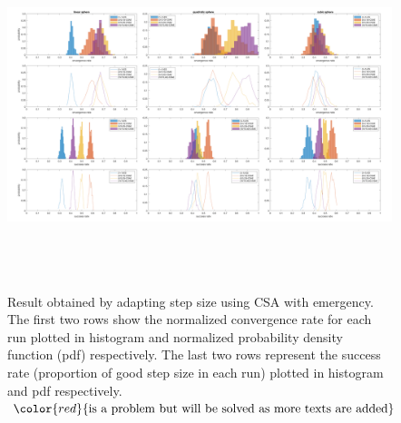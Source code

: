 \begin{center}
\begin{figure}
\includegraphics[height=4in, width=6in]{success_convergence_emergency_modified}
\caption{Result obtained by adapting step size using CSA with emergency. The first two rows show the normalized convergence rate for each run plotted in histogram and normalized probability density function (pdf) respectively. The last two rows represent the success rate (proportion of good step size in each run) plotted in histogram and pdf respectively. $\color{red}{\text{is a problem but will be solved as more texts are added}}$}
\label{fig:success_convergence_emergency}
\end{figure}
\end{center}


